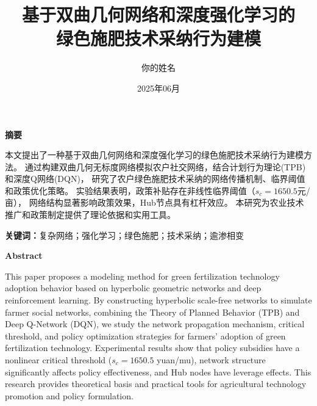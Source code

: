 \documentclass[12pt,a4paper]{article}
\title{基于双曲几何网络和深度强化学习的\\绿色施肥技术采纳行为建模}
\author{你的姓名}
\date{2025年06月}
\newcommand{\heiti}{\CJKfamily{zhhei}}  %
\renewcommand{\headrulewidth}{3pt}  %
\numberwithin{equation}{section}
\begin{document}

\thispagestyle{frontmatter}
\renewcommand{\headrulewidth}{0pt}  %

\begin{center}
    {\fontsize{18}{18}\bfseries\heiti 摘要}
\end{center}

\vspace{0.5\baselineskip}

本文提出了一种基于双曲几何网络和深度强化学习的绿色施肥技术采纳行为建模方法。
通过构建双曲几何无标度网络模拟农户社交网络，结合计划行为理论(TPB)和深度Q网络(DQN)，
研究了农户绿色施肥技术采纳的网络传播机制、临界阈值和政策优化策略。
实验结果表明，政策补贴存在非线性临界阈值（$s_c = 1650.5$元/亩），
网络结构显著影响政策效果，Hub节点具有杠杆效应。
本研究为农业技术推广和政策制定提供了理论依据和实用工具。

\vspace{1\baselineskip}  %

{\bfseries\heiti 关键词：}复杂网络；强化学习；绿色施肥；技术采纳；逾渗相变

\newpage

\thispagestyle{frontmatter}

\begin{center}
    {\fontsize{18}{18}\bfseries Abstract}
\end{center}

\vspace{0.5\baselineskip}

This paper proposes a modeling method for green fertilization technology adoption behavior 
based on hyperbolic geometric networks and deep reinforcement learning.
By constructing hyperbolic scale-free networks to simulate farmer social networks, 
combining the Theory of Planned Behavior (TPB) and Deep Q-Network (DQN),
we study the network propagation mechanism, critical threshold, and policy optimization strategies 
for farmers' adoption of green fertilization technology.
Experimental results show that policy subsidies have a nonlinear critical threshold 
($s_c = 1650.5$ yuan/mu), network structure significantly affects policy effectiveness, 
and Hub nodes have leverage effects.
This research provides theoretical basis and practical tools for agricultural technology promotion 
and policy formulation.
\end{document}
